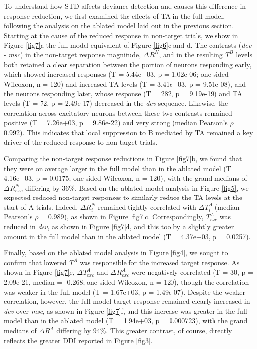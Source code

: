 \documentclass[pdflatex,referee,iicol,sn-basic]{sn-jnl}
\newcommand{\dev}{\textit{dev}}
\newcommand{\msc}{\textit{msc}}
\renewcommand{\R}[3][]{{}^{#1}_{}\!R^{#2}_{#3}}
\renewcommand{\T}[3][]{{}^{#1}_{}T^{#2}_{#3}}
\theoremstyle{thmstyleone}%
\theoremstyle{thmstyletwo}%
\theoremstyle{thmstylethree}%
\begin{document}
To understand how STD affects deviance detection and causes this difference in response reduction, we first examined the effects of TA in the full model, following the analysis on the ablated model laid out in the previous section. Starting at the cause of the reduced response in non-target trials, we show in Figure \ref{fig7}a the full model equivalent of Figure \ref{fig6}c and d. The contrasts (\dev{} - \msc{}) in the non-target response magnitude, $\Delta \R{N}{}$, and in the resulting $\T{B}{}$ levels both retained a clear separation between the portion of neurons responding early, which showed increased responses (T = 5.44e+03, p = 1.02e-06; one-sided Wilcoxon, n = 120) and increased TA levels (T = 3.41e+03, p = 9.51e-08), and the neurons responding later, whose response (T = 282, p = 9.19e-19) and TA levels (T = 72, p = 2.49e-17) decreased in the \dev{} sequence. Likewise, the correlation across excitatory neurons between these two contrasts remained positive (T = 7.26e+03, p = 9.86e-22) and very strong (median Pearson's $\rho$ = 0.992). This indicates that local suppression to B mediated by TA remained a key driver of the reduced response to non-target trials.

Comparing the non-target response reductions in Figure \ref{fig7}b, we found that they were on average larger in the full model than in the ablated model (T = 4.16e+03, p = 0.0175; one-sided Wilcoxon, n = 120), with the grand medians of $\Delta \R{N}{exc}$ differing by 36\%. Based on the ablated model analysis in Figure \ref{fig5}, we expected reduced non-target responses to similarly reduce the TA levels at the start of A trials. Indeed, $\Delta \R{N}{i}$ remained tightly correlated with $\Delta \T{A}{i}$ (median Pearson's $\rho$ = 0.989), as shown in Figure \ref{fig7}c. Correspondingly, $\T{A}{exc}$ was reduced in \dev{}, as shown in Figure \ref{fig7}d, and this too by a slightly greater amount in the full model than in the ablated model (T = 4.37e+03, p = 0.0257).

Finally, based on the ablated model analysis in Figure \ref{fig4}, we sought to confirm that lowered $\T{A}{}$ was responsible for the increased target response. As shown in Figure \ref{fig7}e, $\Delta \T{A}{exc}$ and $\Delta \R{A}{exc}$ were negatively correlated (T = 30, p = 2.09e-21, median = -0.268; one-sided Wilcoxon, n = 120), though the correlation was weaker in the full model (T = 1.67e+03, p = 1.49e-07). Despite the weaker correlation, however, the full model target response remained clearly increased in \dev{} over \msc{}, as shown in Figure \ref{fig7}f, and this increase was greater in the full model than in the ablated model (T = 1.94e+03, p = 0.000723), with the grand medians of $\Delta \R{A}{}$ differing by 94\%. This greater contrast, of course, directly reflects the greater DDI reported in Figure \ref{fig3}.
\end{document}
